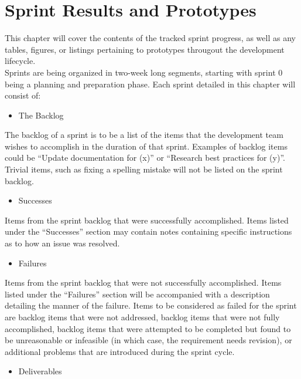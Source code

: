 
\chapter{Sprint Results and Prototypes}    
    \hspace{7mm}This chapter will cover the contents of the tracked sprint progress, as well as any tables, figures, or listings
    pertaining to prototypes througout the development lifecycle.\\

    Sprints are being organized in two-week long segments, starting with sprint 0 being a planning and preparation phase.
    Each sprint detailed in this chapter will consist of:
    \begin{itemize} \item The Backlog \end{itemize}
    
        The backlog of a sprint is to be a list of the items that the development team wishes to accomplish in the duration
        of that sprint. Examples of backlog items could be ``Update documentation for (x)'' or ``Research best practices for (y)''.
        Trivial items, such as fixing a spelling mistake will not be listed on the sprint backlog.\\

    \begin{itemize} \item Successes \end{itemize}
        
        Items from the sprint backlog that were successfully accomplished.  Items listed under the ``Successes'' section
        may contain notes containing specific instructions as to how an issue was resolved.\\

    \begin{itemize} \item Failures \end{itemize}
        
        Items from the sprint backlog that were not successfully accomplished.  Items listed under the ``Failures'' section
        will be accompanied with a description detailing the manner of the failure.  Items to be considered as failed for the
        sprint are backlog items that were not addressed, backlog items that were not fully accomplished, backlog items that
        were attempted to be completed but found to be unreasonable or infeasible (in which case, the requirement needs revision),
        or additional problems that are introduced during the sprint cycle.\\
    \begin{itemize} \item Deliverables \end{itemize}
        

